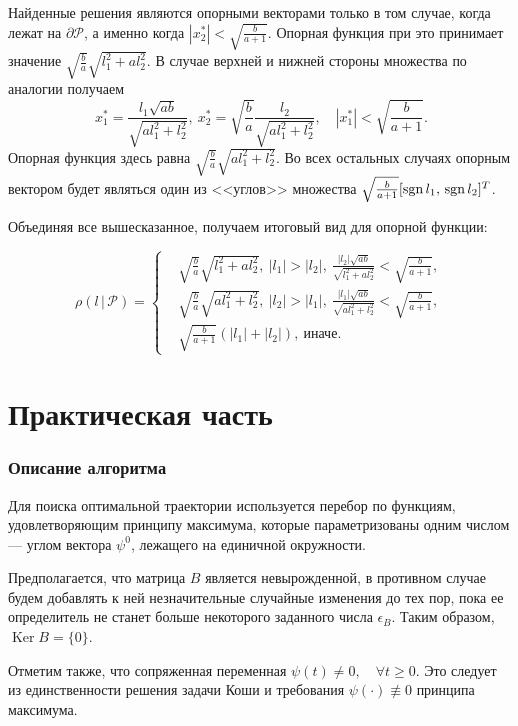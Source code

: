\documentclass[11pt]{article}
\newcommand\PS{\mathcal{P}}
\newcommand\Sup[2]{\rho( #1 \, | \, #2 )}
\newcommand\Sgn{{\rm sgn \,}}
\DeclareMathOperator{\Ker}{Ker}
\begin{document}
Найденные решения являются опорными векторами только в том случае, когда лежат на $\partial \PS$, 
а именно когда $|x_2^*| < \sqrt{\frac{b}{a+1}}$. Опорная функция при это принимает значение 
$\sqrt{\frac{b}{a}}\sqrt{l_1^2+al_2^2}$. В случае верхней и нижней стороны множества по аналогии получаем
$$\ x_1^* = \frac{l_1\sqrt{ab}}{\sqrt{al_1^2+l_2^2}},\  x_2^* = \sqrt{\frac{b}{a}}\frac{l_2}{\sqrt{al_1^2+l_2^2}}, \quad |x_1^*| < \sqrt{\frac{b}{a+1}}.$$
Опорная функция здесь равна $\sqrt{\frac{b}{a}}\sqrt{al_1^2+l_2^2}$. Во всех остальных случаях опорным 
вектором будет являться один из <<углов>> множества $\sqrt{\frac{b}{a+1}}[\Sgn{l_1}, \, \Sgn{l_2}]^T$.

Объединяя все вышесказанное, получаем итоговый вид для опорной функции:

\begin{equation}
\Sup{l}{\PS} = 
\left\{
	\begin{aligned}
	& \sqrt{\frac{b}{a}}\sqrt{l_1^2+al_2^2}, \ |l_1| > |l_2|, \  \frac{|l_2|\sqrt{ab}}{\sqrt{l_1^2+al_2^2}} < \sqrt{\frac{b}{a+1}},\\
	& \sqrt{\frac{b}{a}}\sqrt{al_1^2+l_2^2}, \ |l_2| > |l_1|, \  \frac{|l_1|\sqrt{ab}}{\sqrt{al_1^2+l_2^2}} < \sqrt{\frac{b}{a+1}},\\
	& \sqrt{\frac{b}{a+1}}(|l_1| + |l_2|), \ \text{иначе}.
	\end{aligned}	
\right.
\end{equation}

\newpage
\part{Практическая часть}
\setcounter{section}{0}
\section{Описание алгоритма}

Для поиска оптимальной траектории используется перебор по функциям, удовлетворяющим принципу
максимума, которые параметризованы одним числом --- углом вектора $\psi^0$, лежащего на 
единичной окружности.

Предполагается, что матрица $B$ является невырожденной, в противном случае будем добавлять к ней
незначительные случайные изменения до тех пор, пока ее определитель не станет больше некоторого
заданного числа $\epsilon_B$. Таким образом, $\Ker B = \{0\}$.

Отметим также, что сопряженная переменная $\psi(t) \not= 0, \quad \forall t \ge 0$.
 Это следует из единственности решения задачи Коши и требования $\psi(\cdot) \not\equiv 0$ 
 принципа максимума.
\end{document}
